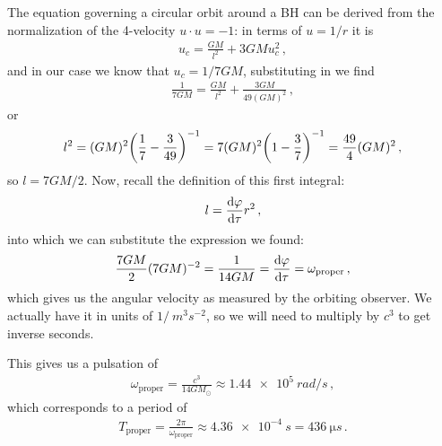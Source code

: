 \documentclass[main.tex]{subfiles}
\begin{document}
The equation governing a circular orbit around a BH can be derived from the normalization of the 4-velocity \(u \cdot u = -1\): in terms of \(u = 1/r\) it is 
%
\begin{align}
  u_c = \frac{GM}{l^2} + 3 GM u_c^2
\,,
\end{align}
%
and in our case we know that \(u_c = 1/7GM\), substituting in we find 
%
\begin{align}
  \frac{1}{7GM} = \frac{GM}{l^2} + \frac{3GM}{49 (GM)^2}
\,,
\end{align}
%
or 
%
\begin{align}
  l^2 = (GM)^2 \qty(\frac{1}{7} - \frac{3}{49})^{-1}
  = 7 (GM)^2 \qty(1 - \frac{3}{7})^{-1} = \frac{49}{4} (GM)^2
\,, 
\end{align}
%
so \(l = 7GM/2\). Now, recall the definition of this first integral: 
%
\begin{align}
  l = \dv{\varphi }{\tau } r^2
\,,
\end{align}
%
into which we can substitute the expression we found: 
%
\begin{align}
  \frac{7GM}{2} (7GM)^{-2} = \frac{1}{14GM} =  \dv{\varphi }{\tau } = \omega_{\text{proper}}
\,,
\end{align}
%
which gives us the angular velocity as measured by the orbiting observer. We actually have it in units of $1/\SI{}{m^3 s^{-2}}$, so we will need to multiply by \(c^3\) to get inverse seconds.

This gives us a pulsation of 
%
\begin{align}
  \omega _{\text{proper}} = \frac{c^3}{14GM_{\odot}} \approx 
  \SI{1.44e5}{rad/s}
\,,
\end{align}
%
which corresponds to a period of 
%
\begin{align}
  T _{\text{proper}} = \frac{2\pi}{\omega _{\text{proper}}} \approx \SI{4.36e-4}{s} = \SI{436}{\micro s}
\,.
\end{align}
\end{document}
